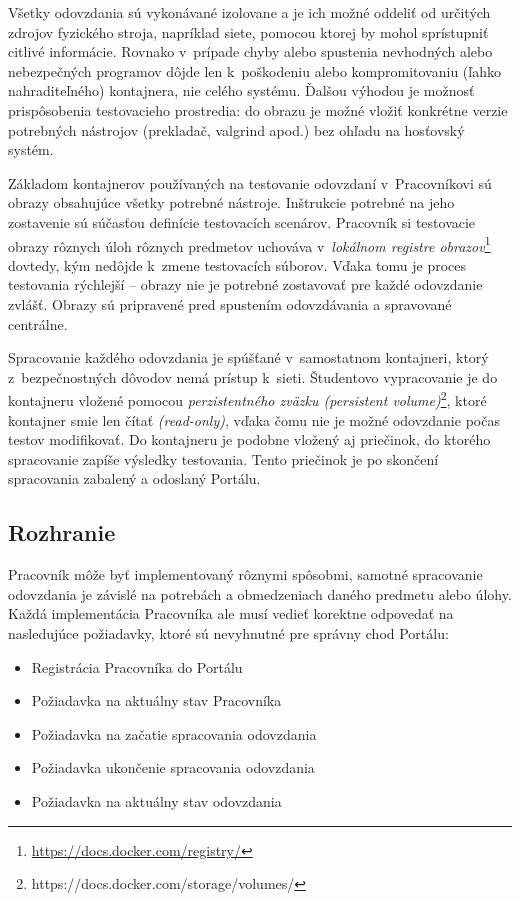 \documentclass[
  digital, %
  oneside, %
  table,   %
  lof,     %
  lot,   %
]{fithesis3}
\begin{document}
Všetky odovzdania sú vykonávané izolovane a je ich možné oddeliť od určitých zdrojov fyzického stroja, napríklad siete, pomocou ktorej by mohol sprístupniť citlivé informácie. Rovnako v~prípade chyby alebo spustenia nevhodných alebo nebezpečných programov dôjde len k~poškodeniu alebo kompromitovaniu (ľahko nahraditeľného) kontajnera, nie celého systému. Ďalšou výhodou je možnosť prispôsobenia testovacieho prostredia: do obrazu je možné vložiť konkrétne verzie potrebných nástrojov (prekladač, valgrind apod.) bez ohľadu na hosťovský systém.

Základom kontajnerov používaných na testovanie odovzdaní v~Pracovníkovi sú obrazy obsahujúce všetky potrebné nástroje. Inštrukcie potrebné na jeho zostavenie sú súčasťou definície testovacích scenárov. Pracovník si testovacie obrazy rôznych úloh rôznych predmetov uchováva v~\emph{lokálnom registre obrazov}\footnote{\url{https://docs.docker.com/registry/}} dovtedy, kým nedôjde k~zmene testovacích súborov. Vďaka tomu je proces testovania rýchlejší -- obrazy nie je potrebné zostavovať pre každé odovzdanie zvlášť. Obrazy sú pripravené pred spustením odovzdávania a spravované centrálne.

Spracovanie každého odovzdania je spúšťané v~samostatnom kontajneri, ktorý z~bezpečnostných dôvodov nemá prístup k~sieti. Študentovo vypracovanie je do kontajneru vložené pomocou \emph{perzistentného zväzku (persistent volume)}\footnote{https://docs.docker.com/storage/volumes/}, ktoré kontajner smie len čítať \emph{(read-only)}, vďaka čomu nie je možné odovzdanie počas testov modifikovať. Do kontajneru je podobne vložený aj priečinok, do ktorého spracovanie zapíše výsledky testovania. Tento priečinok je po skončení spracovania zabalený a odoslaný Portálu.

\subsection{Rozhranie}

Pracovník môže byť implementovaný rôznymi spôsobmi, samotné spracovanie odovzdania je závislé na potrebách a obmedzeniach daného predmetu alebo úlohy. Každá implementácia Pracovníka ale musí vedieť korektne odpovedať na nasledujúce požiadavky, ktoré sú nevyhnutné pre správny chod Portálu:

\begin{itemize}
    \item Registrácia Pracovníka do Portálu
    \item Požiadavka na aktuálny stav Pracovníka
    \item Požiadavka na začatie spracovania odovzdania
    \item Požiadavka ukončenie spracovania odovzdania
    \item Požiadavka na aktuálny stav odovzdania
\end{itemize}
\end{document}
